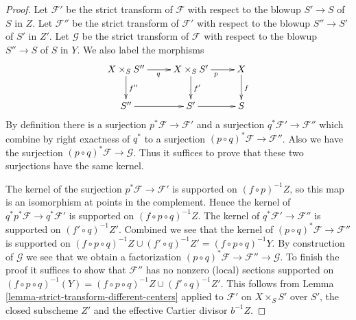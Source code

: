 \documentclass[10pt,a4paper]{amsart}
\theoremstyle{plain}
\theoremstyle{definition}
\theoremstyle{remark}
\numberwithin{equation}{subsection}
\begin{document}
\begin{proof}
Let $\mathcal{F}'$ be the strict transform of $\mathcal{F}$ with respect
to the blowup $S' \to S$ of $S$ in $Z$.
Let $\mathcal{F}''$ be the strict transform of $\mathcal{F}'$ with respect
to the blowup $S'' \to S'$ of $S'$ in $Z'$.
Let $\mathcal{G}$ be the strict transform of $\mathcal{F}$ with respect
to the blowup $S'' \to S$ of $S$ in $Y$.
We also label the morphisms
$$
\xymatrix{
X \times_S S'' \ar[r]_q \ar[d]^{f''} &
X \times_S S' \ar[r]_p \ar[d]^{f'} &
X \ar[d]^f \\
S'' \ar[r] & S' \ar[r] & S
}
$$
By definition there is a surjection $p^*\mathcal{F} \to \mathcal{F}'$
and a surjection $q^*\mathcal{F}' \to \mathcal{F}''$ which combine
by right exactness of $q^*$ to a surjection
$(p \circ q)^*\mathcal{F} \to \mathcal{F}''$. Also we have the surjection
$(p \circ q)^*\mathcal{F} \to \mathcal{G}$. Thus it suffices to prove
that these two surjections have the same kernel.

\medskip\noindent
The kernel of the surjection $p^*\mathcal{F} \to \mathcal{F}'$
is supported on $(f \circ p)^{-1}Z$, so this map is an isomorphism at
points in the complement. Hence the kernel of
$q^*p^*\mathcal{F} \to q^*\mathcal{F}'$
is supported on $(f \circ p \circ q)^{-1}Z$. The kernel of
$q^*\mathcal{F}' \to \mathcal{F}''$ is supported on $(f' \circ q)^{-1}Z'$.
Combined we see that the kernel of
$(p \circ q)^*\mathcal{F} \to \mathcal{F}''$ is supported on
$(f \circ p \circ q)^{-1}Z \cup (f' \circ q)^{-1}Z' =
(f \circ p \circ q)^{-1}Y$.
By construction of $\mathcal{G}$ we see that we obtain a factorization
$(p \circ q)^*\mathcal{F} \to \mathcal{F}'' \to \mathcal{G}$.
To finish the proof it suffices to show that $\mathcal{F}''$ has no
nonzero (local) sections supported on
$(f \circ p \circ q)^{-1}(Y) =
(f \circ p \circ q)^{-1}Z \cup (f' \circ q)^{-1}Z'$.
This follows from Lemma \ref{lemma-strict-transform-different-centers}
applied to $\mathcal{F}'$ on $X \times_S S'$ over $S'$, the closed
subscheme $Z'$ and the effective Cartier divisor $b^{-1}Z$.
\end{proof}
\end{document}
